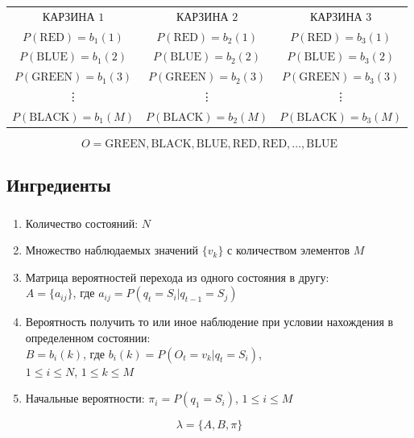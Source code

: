 \documentclass{beamer}
\begin{document}
\begin{frame}
  \frametitle{\insertsection}
  \framesubtitle{\insertsubsection}

  \begin{table}
    \begin{tabular}{ccc}
      КАРЗИНА $1$ & КАРЗИНА $2$ & КАРЗИНА $3$ \\
      $P(\text{RED}) = b_1(1)$ & $P(\text{RED}) = b_2(1)$ & $P(\text{RED}) = b_3(1)$ \\
      $P(\text{BLUE}) = b_1(2)$ & $P(\text{BLUE}) = b_2(2)$ & $P(\text{BLUE}) = b_3(2)$ \\
      $P(\text{GREEN}) = b_1(3)$ & $P(\text{GREEN}) = b_2(3)$ & $P(\text{GREEN}) = b_3(3)$ \\
      \vdots & \vdots & \vdots \\
      $P(\text{BLACK}) = b_1(M)$ & $P(\text{BLACK}) = b_2(M)$ & $P(\text{BLACK}) = b_3(M)$ \\
    \end{tabular}
  \end{table}

  \begin{equation*}
  O = \text{GREEN},  \text{BLACK}, \text{BLUE}, \text{RED}, \text{RED}, \ldots, \text{BLUE}
  \end{equation*}

\end{frame}

\subsection{Ингредиенты}

\begin{frame}
  \frametitle{\insertsection}
  \framesubtitle{\insertsubsection}
  \begin{enumerate}
  \item Количество состояний: $N$ \pause
  \item Множество наблюдаемых значений $\{v_k\}$ с количеством элементов $M$ \pause
  \item Матрица вероятностей перехода из одного состояния в другу: \\
    $A = \{a_{ij}\}$, где $a_{ij} = P(q_t = S_i | q_{t - 1} = S_j)$ \pause
  \item Вероятность получить то или иное наблюдение при условии нахождения в определенном состоянии: \\
    $B = {b_i(k)}$, где $b_i(k) = P(O_t = v_k | q_t = S_i)$, \\
    $1 \le i \le N$, $1 \le k \le M$ \pause
    \item Начальные вероятности: $\pi_i = P(q_1 = S_i)$, $1 \le i \le M$
  \end{enumerate}

  \pause
  \begin{equation*}
    \lambda = \{A, B, \pi\}  %
  \end{equation*}

\end{frame}
\end{document}

